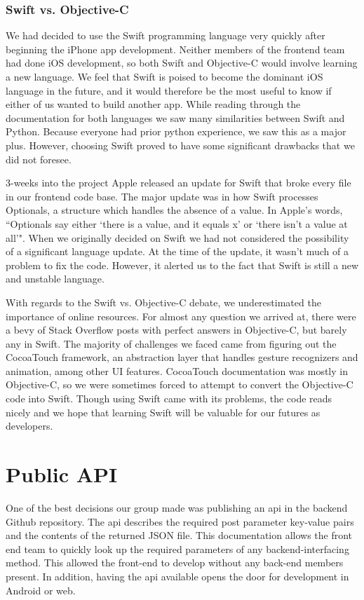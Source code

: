 \documentclass[12pt]{article}
\begin{document}
\subsubsection{Swift vs. Objective-C}
We had decided to use the Swift programming language very quickly after beginning the iPhone app development.
Neither members of the frontend team had done iOS development, so both Swift and Objective-C would involve learning a new language. 
We feel that Swift is poised to become the dominant iOS language in the future, and it would therefore be the most useful to know if either of us wanted to build another app. 
While reading through the documentation for both languages we saw many similarities between Swift and Python. 
Because everyone had prior python experience, we saw this as a major plus. 
However, choosing Swift proved to have some significant drawbacks that we did not foresee. 

\bigskip

3-weeks into the project Apple released an update for Swift that broke every file in our frontend code base. 
The major update was in how Swift processes Optionals, a structure which handles the absence of a value. 
In Apple's words, ``Optionals say either `there is a value, and it equals x' or `there isn't a value at all'". 
When we originally decided on Swift we had not considered the possibility of a significant language update. 
At the time of the update, it wasn't much of a problem to fix the code. 
However, it alerted us to the fact that Swift is still a new and unstable language. 

\bigskip

With regards to the Swift vs. Objective-C debate, we underestimated the importance of online resources. 
For almost any question we arrived at, there were a bevy of Stack Overflow posts with perfect answers in Objective-C, but barely any in Swift. 
The majority of challenges we faced came from figuring out the CocoaTouch framework, an abstraction layer that handles gesture recognizers and animation, among other UI features. 
CocoaTouch documentation was mostly in Objective-C, so we were sometimes forced to attempt to convert the Objective-C code into Swift. 
Though using Swift came with its problems, the code reads nicely and we hope that learning Swift will be valuable for our futures as developers.

\bigskip

\section{Public API}
One of the best decisions our group made was publishing an api in the backend Github repository. 
The api describes the required post parameter key-value pairs and the contents of the returned JSON file. 
This documentation allows the front end team to quickly look up the required parameters of any backend-interfacing method. 
This allowed the front-end to develop without any back-end members present.
In addition, having the api available opens the door for development in Android or web.
\end{document}
